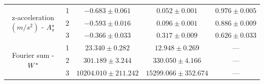 \begin{table}[ht]
{\begin{tabular}{ccccc}
    \multirow{3}{*}{z-acceleration $(m/s^2)$ - $A^*_z$} & 1                                    & $-0.683 \pm 0.061$ & $0.052 \pm 0.001$ & $0.976 \pm 0.005$ \\
                                                                                   & 2                                    & $-0.593 \pm 0.016$ & $0.096 \pm 0.001$ & $0.886 \pm 0.009$ \\
                                                                                   & 3                                    & $-0.366 \pm 0.033$ & $0.317 \pm 0.009$ & $0.626 \pm 0.033$ \\ \hline
    \multirow{3}{*}{Fourier sum - $W^*$}                                      & 1                                    & $23.340 \pm 0.282$ & $12.948 \pm 0.269$ & ---             \\
                                                                                   & 2                                    & $301.189 \pm 3.244$ & $330.050 \pm 4.166$ & ---             \\
                                                                                   & 3                                    & $10204.010 \pm 211.242$ & $15299.066 \pm 352.674$ & ---             \\ \hline
    \end{tabular}
    }
    \label{table:emis_dists_CarHHMM-DFT}
\end{table}

